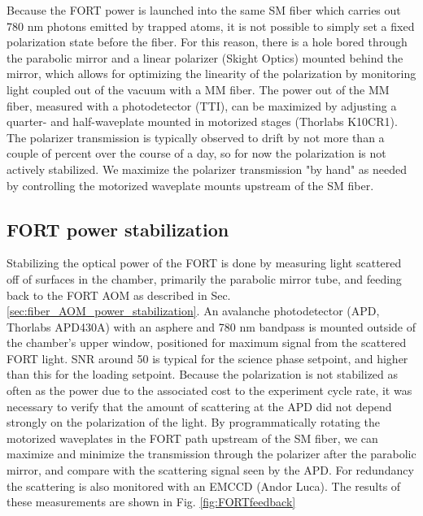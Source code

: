 
Because the FORT power is launched into the same SM fiber which carries out 780 nm photons emitted by trapped atoms, it is not possible to simply set a fixed polarization state before the fiber. For this reason, there is a hole bored through the parabolic mirror and a linear polarizer (Skight Optics) mounted behind the mirror, which allows for optimizing the linearity of the polarization by monitoring light coupled out of the vacuum with a MM fiber. The power out of the MM fiber, measured with a photodetector (TTI), can be maximized by adjusting a quarter- and half-waveplate mounted in motorized stages (Thorlabs K10CR1). The polarizer transmission is typically observed to drift by not more than a couple of percent over the course of a day, so for now the polarization is not actively stabilized. We maximize the polarizer transmission "by hand" as needed by controlling the motorized waveplate mounts upstream of the SM fiber.


\subsection{FORT power stabilization}

Stabilizing the optical power of the FORT is done by measuring light scattered off of surfaces in the chamber, primarily the parabolic mirror tube, and feeding back to the FORT AOM as described in Sec. \ref{sec:fiber_AOM_power_stabilization}. An avalanche photodetector (APD, Thorlabs APD430A) with an asphere and 780 nm bandpass is mounted outside of the chamber's upper window, positioned for maximum signal from the scattered FORT light. SNR around 50 is typical for the science phase setpoint, and higher than this for the loading setpoint. Because the polarization is not stabilized as often as the power due to the associated cost to the experiment cycle rate, it was necessary to verify that the amount of scattering at the APD did not depend strongly on the polarization of the light. By programmatically rotating the motorized waveplates in the FORT path upstream of the SM fiber, we can maximize and minimize the transmission through the polarizer after the parabolic mirror, and compare with the scattering signal seen by the APD. For redundancy the scattering is also monitored with an EMCCD (Andor Luca). The results of these measurements are shown in Fig. \ref{fig:FORTfeedback}

